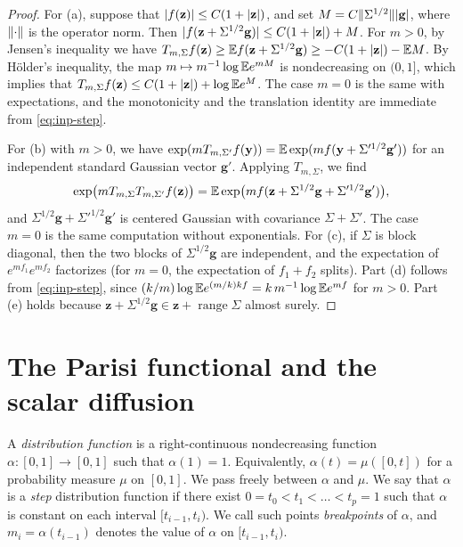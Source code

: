 \begin{proof}
For (a), suppose that $\lvert f(\mathbf z)\rvert\le C(1+\lvert \mathbf z\rvert)$, and set
$M=C\lVert \Sigma^{1/2}\rVert\lvert \mathbf g\rvert$, where $\lVert \cdot\rVert$ is the operator
norm. Then $\lvert f(\mathbf z+\Sigma^{1/2}\mathbf g)\rvert\le C(1+\lvert \mathbf
z\rvert)+M$. For $m>0$, by Jensen's inequality we have $T_{m,\Sigma}f(\mathbf z)\ge
\mathbb E f(\mathbf z+\Sigma^{1/2}\mathbf g)\ge -C(1+\lvert \mathbf z\rvert)-\mathbb E M$. By H\"older's
inequality, the map $m\mapsto m^{-1}\log\mathbb E e^{mM}$ is nondecreasing on $(0,1]$,
which implies that $T_{m,\Sigma}f(\mathbf z)\le C(1+\lvert \mathbf z\rvert)+\log\mathbb E
e^{M}$. The case $m=0$ is the same with expectations, and the monotonicity and
the translation identity are immediate from \eqref{eq:inp-step}.

For (b) with $m>0$, we have $\exp(mT_{m,\Sigma'}f(\mathbf y))=\mathbb E\exp(mf(\mathbf
y+\Sigma'^{1/2}\mathbf g'))$ for an independent standard Gaussian vector $\mathbf
g'$. Applying $T_{m,\Sigma}$, we find
\[
 \exp\bigl(mT_{m,\Sigma}T_{m,\Sigma'}f(\mathbf z)\bigr)
 =\mathbb E\exp\bigl(mf(\mathbf z+\Sigma^{1/2}\mathbf g+\Sigma'^{1/2}\mathbf g')\bigr),
\]
and $\Sigma^{1/2}\mathbf g+\Sigma'^{1/2}\mathbf g'$ is centered Gaussian with
covariance $\Sigma+\Sigma'$. The case $m=0$ is the same computation without
exponentials. For (c), if $\Sigma$ is block diagonal, then the two blocks of
$\Sigma^{1/2}\mathbf g$ are independent, and the expectation of
$e^{mf_1}e^{mf_2}$ factorizes (for $m=0$, the expectation of $f_1+f_2$ splits).
Part (d) follows from \eqref{eq:inp-step}, since $(k/m)\log\mathbb E e^{(m/k)kf}
=k\,m^{-1}\log\mathbb E e^{mf}$ for $m>0$. Part (e) holds because $\mathbf
z+\Sigma^{1/2}\mathbf g\in\mathbf z+\operatorname{range}\Sigma$ almost surely.
\end{proof}

\section{The Parisi functional and the scalar diffusion}\label{b:sec:scalar}

A \emph{distribution function} is a right-continuous nondecreasing function
$\alpha\colon[0,1]\to[0,1]$ such that $\alpha(1)=1$. Equivalently,
$\alpha(t)=\mu([0,t])$ for a probability measure $\mu$ on $[0,1]$. We pass
freely between $\alpha$ and $\mu$. We say that $\alpha$ is a \emph{step}
distribution function if there exist $0=t_0<t_1<\dots<t_p=1$ such that $\alpha$
is constant on each interval $[t_{i-1},t_i)$. We call such points
\emph{breakpoints} of $\alpha$, and $m_i=\alpha(t_{i-1})$ denotes the value of
$\alpha$ on $[t_{i-1},t_i)$.

